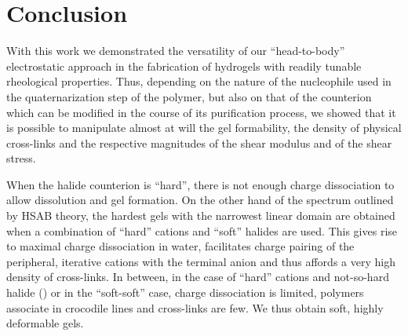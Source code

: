 \documentclass[journal=jacsat,manuscript=article]{achemso}
\begin{document}

\section{Conclusion}
With this work we demonstrated the versatility of our ``head-to-body'' electrostatic approach in the fabrication of hydrogels with readily tunable rheological properties. Thus, depending on the nature of the nucleophile used in the quaternarization step of the polymer, but also on that of the counterion which can be modified in the course of its purification process, we showed that it is possible to manipulate almost at will the gel formability, the density of physical cross-links and the respective magnitudes of the shear modulus and of the shear stress. 

When the halide counterion is ``hard'', there is not enough charge dissociation to allow dissolution and gel formation. On the other hand of the spectrum outlined by HSAB theory, the hardest gels with the narrowest linear domain are obtained when a combination of ``hard'' cations and ``soft'' halides are used. This gives rise to maximal charge dissociation in water, facilitates charge pairing of the peripheral, iterative cations with the terminal anion and thus affords a very high density of cross-links. In between, in the case of ``hard'' cations and not-so-hard halide () or in the ``soft-soft'' case, charge dissociation is limited, polymers associate in crocodile lines and cross-links are few. We thus obtain soft, highly deformable gels.
\end{document}
